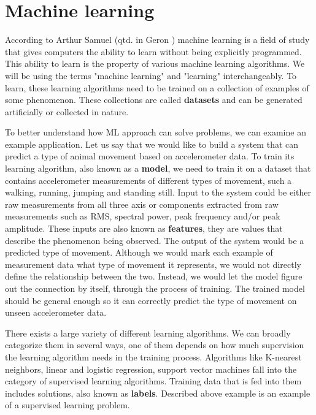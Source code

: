 \section{ Machine learning}

According to Arthur Samuel (qtd. in Geron \cite{geron}) machine learning is a field of study that gives computers the ability to learn without being explicitly programmed.
This ability to learn is the property of various machine learning algorithms.
We will be using the terms "machine learning" and "learning" interchangeably. 
To learn, these learning algorithms need to be trained on a collection of examples of some phenomenon\cite{burkovml}. 
These collections are called \textbf{datasets} and can be generated artificially or collected in nature.

To better understand how ML approach can solve problems, we can examine an example application.
Let us say that we would like to build a system that can predict a type of animal movement based on accelerometer data.
To train its learning algorithm, also known as a \textbf{model}, we need to train it on a dataset that contains accelerometer measurements of different types of movement, such a walking, running, jumping and standing still.
Input to the system could be either raw measurements from all three axis or components extracted from raw measurements such as RMS, spectral power, peak frequency and/or peak amplitude. 
These inputs are also known as \textbf{features}, they are values that describe the phenomenon being observed\cite{burkovml}. 
The output of the system would be a predicted type of movement.
Although we would mark each example of measurement data what type of movement it represents, we would not directly define the relationship between the two.
Instead, we would let the model figure out the connection by itself, through the process of training.
The trained model should be general enough so it can correctly predict the type of movement on unseen accelerometer data.

There exists a large variety of different learning algorithms. 
We can broadly categorize them in several ways, one of them depends on how much supervision the learning algorithm needs in the training process. 
Algorithms like K-nearest neighbors, linear and logistic regression, support vector machines fall into the category of supervised learning algorithms.
Training data that is fed into them includes solutions, also known as \textbf{labels}\cite{geron}.
Described above example is an example of a supervised learning problem.

